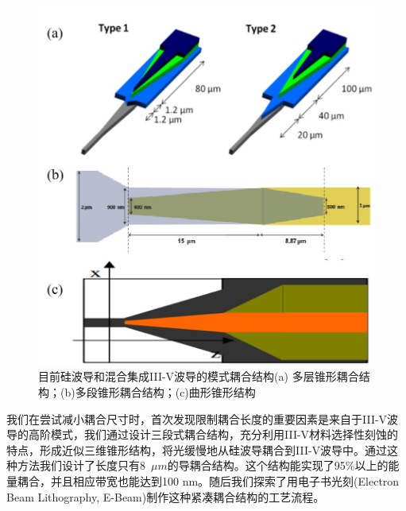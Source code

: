 \begin{figure}[htb]
	\centering
	\includegraphics[width=12cm]{./Pictures/fig_ch3_background_str.jpg}
	\caption{ 目前硅波导和混合集成III-V波导的模式耦合结构(a) 多层锥形耦合结构\cite{kurczveil2013characterization}；(b)多段锥形耦合结构\cite{keyvaninia2009engineering}；(c)曲形锥形结构\cite{wang2012heterogeneous}}
	\label{fig_ch3_background_str}
\end{figure}

我们在尝试减小耦合尺寸时，首次发现限制耦合长度的重要因素是来自于III-V波导的高阶模式，我们通过设计三段式耦合结构，充分利用III-V材料选择性刻蚀的特点，形成近似三维锥形结构，将光缓慢地从硅波导耦合到III-V波导中。通过这种方法我们设计了长度只有8~$\mu m$的导耦合结构。这个结构能实现了95\%以上的能量耦合，并且相应带宽也能达到100 nm。随后我们探索了用电子书光刻(Electron Beam Lithography, E-Beam)制作这种紧凑耦合结构的工艺流程。
